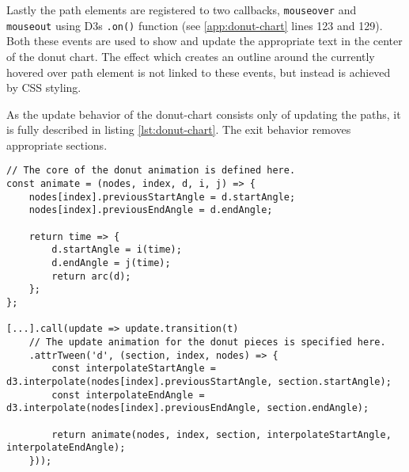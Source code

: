 Lastly the path elements are registered to two callbacks, \texttt{mouseover} and \texttt{mouseout} using D3s \texttt{.on()} function (see \ref{app:donut-chart} lines 123 and 129). Both these events are used to show and update the appropriate text in the center of the donut chart. The effect which creates an outline around the currently hovered over path element is not linked to these events, but instead is achieved by CSS styling.

As the update behavior of the donut-chart consists only of updating the paths, it is fully described in listing \ref{lst:donut-chart}. The exit behavior removes appropriate sections.

\begin{minipage}{0.9\linewidth}
    \begin{lstlisting}[style=htmlCSSjs, captionpos=b, caption={The implementation of the arc update animations. As the core of the animation donut sections is used by the enter and the update behavior, it is defined first. The new values for start and end angle are stored on the node itself. This needs to be done to be able to reference these values again for the next update, as the previous angles will not be accessible through the pie object after regenerating it for an update. Finally the function which is called for each frame of the animation is defined and returned. This function first interpolates the start and end angle values using the passed interpolation functions and the time value. This time value is in the range of zero to one, depending on how far along the animation is. These newly interpolated angles define the start and end angle of the pie piece, which is then turned into a path element by calling the \texttt{arc} function for this pie piece. As the interpolate functions \texttt{interpolateStartAngle} and \texttt{interpolateEndAngle} differ for the enter and update behavior, they are defined in the respective sections. They are passed into the core \texttt{animate} function. (Section from \ref{app:donut-chart} lines 136ff)}, label={lst:donut-chart}]
// The core of the donut animation is defined here.
const animate = (nodes, index, d, i, j) => {
    nodes[index].previousStartAngle = d.startAngle;
    nodes[index].previousEndAngle = d.endAngle;
    
    return time => {
        d.startAngle = i(time);
        d.endAngle = j(time);
        return arc(d);
    };
};

[...].call(update => update.transition(t)
    // The update animation for the donut pieces is specified here.
    .attrTween('d', (section, index, nodes) => {
        const interpolateStartAngle = d3.interpolate(nodes[index].previousStartAngle, section.startAngle);
        const interpolateEndAngle = d3.interpolate(nodes[index].previousEndAngle, section.endAngle);

        return animate(nodes, index, section, interpolateStartAngle, interpolateEndAngle);
    }));
    \end{lstlisting}
\end{minipage}


